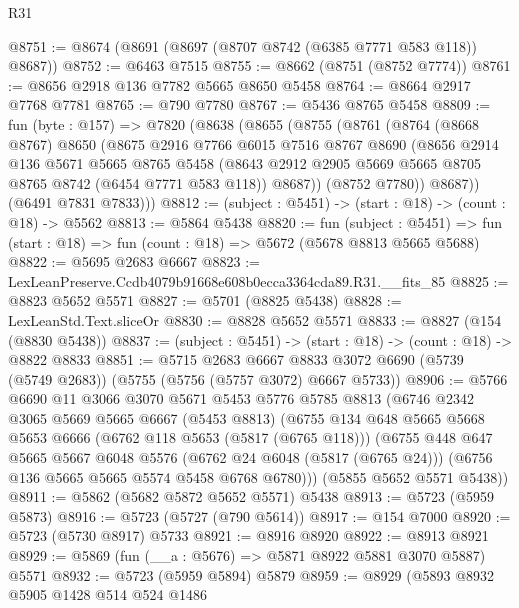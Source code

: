 \begin{lexlean}{R31}
\begin{coremodule}
@8751 := @8674 (@8691 (@8697 (@8707 @8742 (@6385 @7771 @583 @118)) @8687))
@8752 := @6463 @7515
@8755 := @8662 (@8751 (@8752 @7774))
@8761 := @8656 @2918 @136 @7782 @5665 @8650 @5458
@8764 := @8664 @2917 @7768 @7781
@8765 := @790 @7780
@8767 := @5436 @8765 @5458
@8809 := fun (byte : @157) =>
  @7820
    (@8638
      (@8655
        (@8755
          (@8761
            (@8764
              (@8668 @8767)
              @8650
              (@8675
                @2916
                @7766
                @6015
                @7516
                @8767
                @8690
                (@8656
                  @2914
                  @136
                  @5671
                  @5665
                  @8765
                  @5458
                  (@8643 @2912 @2905 @5669 @5665 @8705 @8765 @8742 (@6454 @7771 @583 @118))
                  @8687))
              (@8752 @7780))
            @8687))
        (@6491 @7831 @7833)))
@8812 := (subject : @5451) -> (start : @18) -> (count : @18) -> @5562
@8813 := @5864 @5438
@8820 := fun (subject : @5451) =>
  fun (start : @18) => fun (count : @18) => @5672 (@5678 @8813 @5665 @5688)
@8822 := @5695 @2683 @6667
@8823 := LexLeanPreserve.Ccdb4079b91668e608b0ecca3364cda89.R31.__fits_85
@8825 := @8823 @5652 @5571
@8827 := @5701 (@8825 @5438)
@8828 := LexLeanStd.Text.sliceOr
@8830 := @8828 @5652 @5571
@8833 := @8827 (@154 (@8830 @5438))
@8837 := (subject : @5451) -> (start : @18) -> (count : @18) -> @8822 @8833
@8851 := @5715
    @2683
    @6667
    @8833
    @3072
    @6690
    (@5739 (@5749 @2683))
    (@5755 (@5756 (@5757 @3072) @6667 @5733))
@8906 := @5766
    @6690
    @11
    @3066
    @3070
    @5671
    @5453
    @5776
    @5785
    @8813
    (@6746
      @2342
      @3065
      @5669
      @5665
      @6667
      (@5453 @8813)
      (@6755
        @134
        @648
        @5665
        @5668
        @5653
        @6666
        (@6762 @118 @5653 (@5817 (@6765 @118)))
        (@6755
          @448
          @647
          @5665
          @5667
          @6048
          @5576
          (@6762 @24 @6048 (@5817 (@6765 @24)))
          (@6756 @136 @5665 @5665 @5574 @5458 @6768 @6780)))
      (@5855 @5652 @5571 @5438))
@8911 := @5862 (@5682 @5872 @5652 @5571) @5438
@8913 := @5723 (@5959 @5873)
@8916 := @5723 (@5727 (@790 @5614))
@8917 := @154 @7000
@8920 := @5723 (@5730 @8917) @5733
@8921 := @8916 @8920
@8922 := @8913 @8921
@8929 := @5869 (fun (__a : @5676) => @5871 @8922 @5881 @3070 @5887) @5571
@8932 := @5723 (@5959 @5894) @5879
@8959 := @8929
    (@5893
      @8932
      @5905
      @1428
      @514
      @524
      @1486

\end{coremodule}
\end{lexlean}
